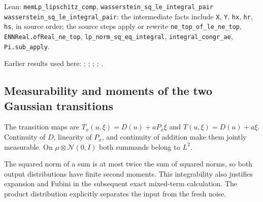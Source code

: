 \documentclass[11pt,a4paper]{report}
\begin{document}
\begin{leanbox}{Lean: \texttt{memLp\_\allowbreak{}lipschitz\_\allowbreak{}comp}, \texttt{wasserstein\_\allowbreak{}sq\_\allowbreak{}le\_\allowbreak{}integral\_\allowbreak{}pair}}
\texttt{wasserstein\_\allowbreak{}sq\_\allowbreak{}le\_\allowbreak{}integral\_\allowbreak{}pair}: the intermediate facts include \texttt{X}, \texttt{Y}, \texttt{hx}, \texttt{hr}, \texttt{hs}, in source order; the source steps apply or rewrite \texttt{ne\_\allowbreak{}top\_\allowbreak{}of\_\allowbreak{}le\_\allowbreak{}ne\_\allowbreak{}top}, \texttt{ENNReal.\allowbreak{}of\allowbreak{}Real\_\allowbreak{}ne\_\allowbreak{}top}, \texttt{lp\_\allowbreak{}norm\_\allowbreak{}sq\_\allowbreak{}eq\_\allowbreak{}integral}, \texttt{integral\_\allowbreak{}congr\_\allowbreak{}ae}, \texttt{Pi.\allowbreak{}sub\_\allowbreak{}apply}.
\end{leanbox}


Earlier results used here: \cite[Section~3.13.1]{LangevinLean2026ULASC}; \cite[Section~3.17.12]{LangevinLean2026ULASC}; \cite[Section~3.17.13]{LangevinLean2026ULASC}; \cite[Section~3.17.3]{LangevinLean2026ULASC}; \cite[Section~3.17.4]{LangevinLean2026ULASC}.
\subsection{\texorpdfstring{Measurability and moments of the two Gaussian transitions}{Measurability and moments of the two Gaussian transitions}}
\label{report-step-ProximalLangevin-MYPGDTransport-lean-2}


The transition maps are \(T_x(u,\xi)=D(u)+aP_x\xi\) and \(T(u,\xi)=D(u)+a\xi\). Continuity of \(D\), linearity of \(P_x\), and continuity of addition make them jointly measurable. On \(\mu\otimes\mathcal N(0,I)\) both summands belong to \(L^2\).



The squared norm of a sum is at most twice the sum of squared norms, so both output distributions have finite second moments. This integrability also justifies expansion and Fubini in the subsequent exact mixed-term calculation. The product distribution explicitly separates the input from the fresh noise.
\end{document}
